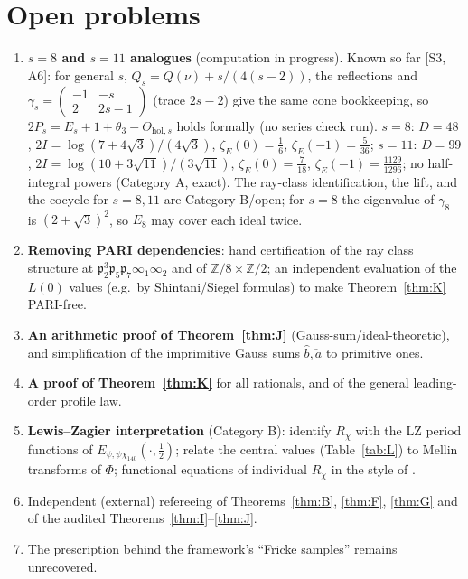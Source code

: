 \documentclass[11pt]{article}
\theoremstyle{definition}
\newcommand{\Z}{\mathbb{Z}}
\newcommand{\fp}{\mathfrak{p}}
\newcommand{\src}[1]{\textup{[S#1]}}
\begin{document}
\section{Open problems}\label{sec:open}
\begin{enumerate}[leftmargin=2em]
\item \textbf{$s=8$ and $s=11$ analogues} (computation in progress). Known so far \src{3, A6}: for general $s$, $Q_s=Q(\nu)+s/(4(s-2))$, the reflections and
$\gamma_s=\begin{pmatrix}-1&-s\\2&2s-1\end{pmatrix}$ (trace $2s-2$) give the same cone bookkeeping, so $2P_s=E_s+1+\theta_3-\Theta_{\mathrm{hol},s}$ holds
formally (no series check run). $s=8$: $D=48$, $2I=\log(7+4\sqrt3)/(4\sqrt3)$, $\zeta_E(0)=\tfrac16$, $\zeta_E(-1)=\tfrac5{36}$; $s=11$: $D=99$,
$2I=\log(10+3\sqrt{11})/(3\sqrt{11})$, $\zeta_E(0)=\tfrac7{18}$, $\zeta_E(-1)=\tfrac{1129}{1296}$; no half-integral powers (Category A, exact). The
ray-class identification, the lift, and the cocycle for $s=8,11$ are Category B/open; for $s=8$ the eigenvalue of $\gamma_8$ is $(2+\sqrt3)^2$, so $E_8$ may
cover each ideal twice.
\item \textbf{Removing PARI dependencies}: hand certification of the ray class structure at $\fp_2^3\fp_5\fp_7\infty_1\infty_2$ and of
$\Z/8\times\Z/2$; an independent evaluation of the $L(0)$ values (e.g.\ by Shintani/Siegel formulas) to make Theorem~\ref{thm:K} PARI-free.
\item \textbf{An arithmetic proof of Theorem~\ref{thm:J}} (Gauss-sum/ideal-theoretic), and simplification of the imprimitive Gauss sums $\widehat b,\check a$
to primitive ones.
\item \textbf{A proof of Theorem~\ref{thm:K}} for all rationals, and of the general leading-order profile law.
\item \textbf{Lewis--Zagier interpretation} (Category B): identify $R_\chi$ with the LZ period functions of $E_{\psi,\psi\chi_{140}}(\cdot,\tfrac12)$; relate the
central values (Table~\ref{tab:L}) to Mellin transforms of $\Phi$; functional equations of individual $R_\chi$ in the style of \cite{RZ}.
\item Independent (external) refereeing of Theorems~\ref{thm:B}, \ref{thm:F}, \ref{thm:G} and of the audited Theorems~\ref{thm:I}--\ref{thm:J}.
\item The prescription behind the framework's ``Fricke samples'' remains unrecovered.
\end{enumerate}
\end{document}
